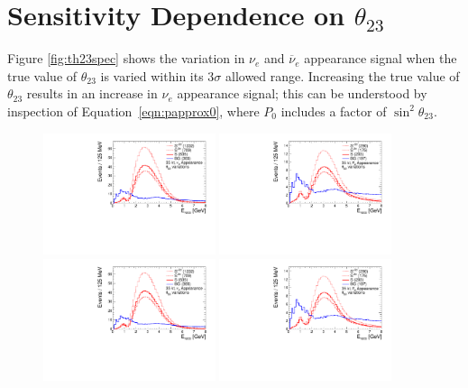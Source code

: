 \documentclass[letterpaper,11pt]{article}
\newcommand{\thetatwothree}{\mbox{$\theta_{23}$}}
\begin{document}
\section{Sensitivity Dependence on $\thetatwothree$}
\label{sect:t23}

Figure \ref{fig:th23spec} shows the variation in $\nu_e$ and $\overline{\nu}_e$
appearance signal when the true value of $\theta_{23}$ is varied within its 3$\sigma$
allowed range. Increasing the true value of $\theta_{23}$ results in an increase in
$\nu_e$ appearance signal; this can be understood by inspection of 
Equation~\ref{eqn:papprox0}, where $P_0$ includes a factor of $\sin^2\theta_{23}$.
\begin{figure}[!htb]
  \centering
  \includegraphics[width=0.45\textwidth]{figs/spectra_35kt_nue_th23var.pdf}
  \includegraphics[width=0.45\textwidth]{figs/spectra_35kt_nuebar_th23var.pdf}
  \includegraphics[width=0.45\textwidth]{figs/spectra_35kt_nue_th23var.pdf}
  \includegraphics[width=0.45\textwidth]{figs/spectra_35kt_nuebar_th23var.pdf}

\end{figure}
\end{document}
